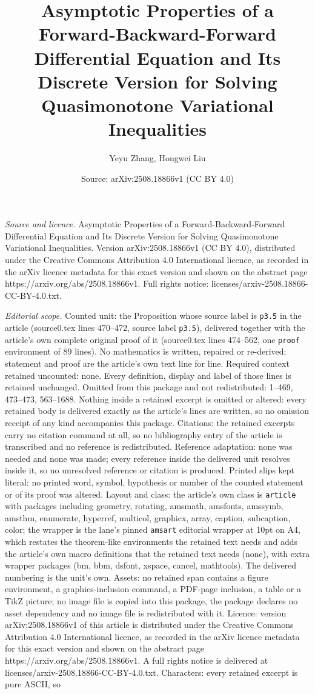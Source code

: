 \documentclass[10pt,a4paper]{amsart}
\title[Asymptotic Properties of a Forward-Backward-Forward Differen]{Asymptotic Properties of a Forward-Backward-Forward Differential Equation and Its Discrete Version for Solving Quasimonotone Variational Inequalities}
\author{Yeyu Zhang, Hongwei Liu}
\date{Source: arXiv:2508.18866v1 (CC BY 4.0)}
\begin{document}
\maketitle

\noindent\emph{Source and licence.} Asymptotic Properties of a Forward-Backward-Forward Differential Equation and Its Discrete Version for Solving Quasimonotone Variational Inequalities. Version arXiv:2508.18866v1 (CC BY 4.0), distributed under the Creative Commons Attribution 4.0 International licence, as recorded in the arXiv licence metadata for this exact version and shown on the abstract page https://arxiv.org/abs/2508.18866v1. Full rights notice: licenses/arxiv-2508.18866-CC-BY-4.0.txt.\par\smallskip

\noindent\textit{Editorial scope.} Counted unit: the Proposition whose source label is \texttt{p3.5} in the article (source0.tex lines 470--472, source label \texttt{p3.5}), delivered together with the article's own complete original proof of it (source0.tex lines 474--562, one \texttt{proof} environment of 89 lines). No mathematics is written, repaired or re-derived: statement and proof are the article's own text line for line. Required context retained uncounted: none. Every definition, display and label of those lines is retained unchanged. Omitted from this package and not redistributed: 1--469, 473--473, 563--1688. Nothing inside a retained excerpt is omitted or altered: every retained body is delivered exactly as the article's lines are written, so no omission receipt of any kind accompanies this package. Citations: the retained excerpts carry no citation command at all, so no bibliography entry of the article is transcribed and no reference is redistributed. Reference adaptation: none was needed and none was made; every reference inside the delivered unit resolves inside it, so no unresolved reference or citation is produced. Printed slips kept literal: no printed word, symbol, hypothesis or number of the counted statement or of its proof was altered. Layout and class: the article's own class is \texttt{article} with packages including geometry, rotating, amsmath, amsfonts, amssymb, amsthm, enumerate, hyperref, multicol, graphicx, array, caption, subcaption, color; the wrapper is the lane's pinned \texttt{amsart} editorial wrapper at 10pt on A4, which restates the theorem-like environments the retained text needs and adds the article's own macro definitions that the retained text needs (none), with extra wrapper packages (bm, bbm, dsfont, xspace, cancel, mathtools). The delivered numbering is the unit's own. Assets: no retained span contains a figure environment, a graphics-inclusion command, a PDF-page inclusion, a table or a TikZ picture; no image file is copied into this package, the package declares no asset dependency and no image file is redistributed with it. Licence: version arXiv:2508.18866v1 of this article is distributed under the Creative Commons Attribution 4.0 International licence, as recorded in the arXiv licence metadata for this exact version and shown on the abstract page https://arxiv.org/abs/2508.18866v1. A full rights notice is delivered at licenses/arxiv-2508.18866-CC-BY-4.0.txt. Characters: every retained excerpt is pure ASCII, so 
\end{document}
